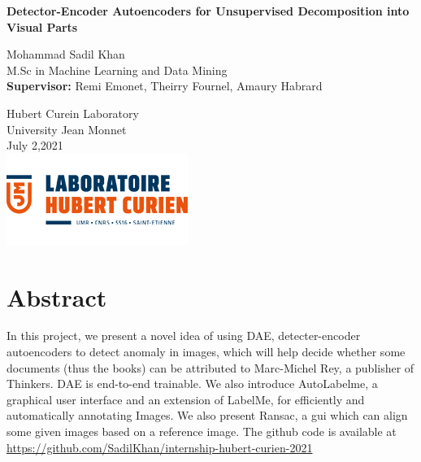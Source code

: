 \documentclass[12pt]{article}
\begin{document}
\begin{titlepage}
\begin{center}
       \vspace*{1cm}

       \textbf{Detector-Encoder Autoencoders for Unsupervised Decomposition into Visual Parts}
       
       \vspace{1.5cm}

       Mohammad Sadil Khan\\M.Sc in Machine Learning and Data Mining\\
       \textbf{Supervisor:} Remi Emonet, Theirry Fournel, Amaury Habrard

       \vfill
            
            
       Hubert Curein Laboratory\\
       University Jean Monnet\\
       July 2,2021\\
       \includegraphics[scale=4]{logo.png}
            
   \end{center}
\end{titlepage}


\newpage
\tableofcontents
\newpage

\section{Abstract}
\setcounter{page}{2}
In this project, we present a novel idea of using DAE, detecter-encoder autoencoders to detect anomaly in images, which will help decide whether some documents (thus the books) can be attributed to Marc-Michel Rey, a publisher of Thinkers. DAE is end-to-end trainable. We also introduce AutoLabelme, a graphical user interface and an extension of LabelMe, for efficiently and automatically annotating Images. We also present Ransac, a gui which can align some given images based on a reference image. The github code is available at \href{https://github.com/SadilKhan/internship-hubert-curien-2021}{https://github.com/SadilKhan/internship-hubert-curien-2021}
\end{document}
